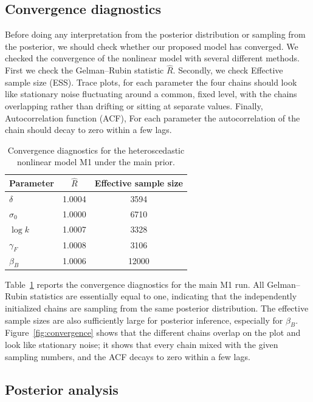 \documentclass[12pt,a4paper]{article}
\begin{document}
\subsection{Convergence diagnostics}
\label{sec:t3-convergence}

Before doing any interpretation from the posterior distribution or sampling from the posterior, we should check whether our proposed model has converged.
We checked the convergence of the nonlinear model with several different methods. First we check the Gelman--Rubin statistic $\hat{R}$. 
Secondly, we check Effective sample size (ESS). 
Trace plots, for each parameter the four chains should look like
        stationary noise fluctuating around a common, fixed level, with the
        chains overlapping rather than drifting or sitting at separate values.
Finally, Autocorrelation function (ACF), For each parameter the autocorrelation of the chain should decay to zero within a few lags.

\begin{table}[ht]
\centering
\caption{Convergence diagnostics for the heteroscedastic nonlinear model M1 under the main prior.}
\label{tab:m1-convergence}
\begin{tabular}{lcc}
\hline
Parameter & $\hat{R}$ & Effective sample size \\
\hline
$\delta$   & 1.0004	 & 3594	 \\
$\sigma_0$ & 1.0000 & 6710  \\
$\log k$   & 1.0007 & 3328  \\
$\gamma_F$ & 1.0008	 & 3106  \\
$\beta_B$  & 1.0006 & 12000 \\
\hline
\end{tabular}
\end{table}

Table~\ref{tab:m1-convergence} reports the convergence diagnostics for the main M1 run. All Gelman--Rubin statistics are essentially equal to one, indicating that the independently initialized chains are sampling from the same posterior distribution. The effective sample sizes are also sufficiently large for posterior inference, especially for $\beta_B$.
Figure~\ref{fig:convergence} shows that the different chains overlap on the plot and look like stationary noise; it shows that every chain mixed with the given sampling numbers, and the ACF decays to zero within a few lags.


\subsection{Posterior analysis}
\label{sec:t3-posterior}
\end{document}
